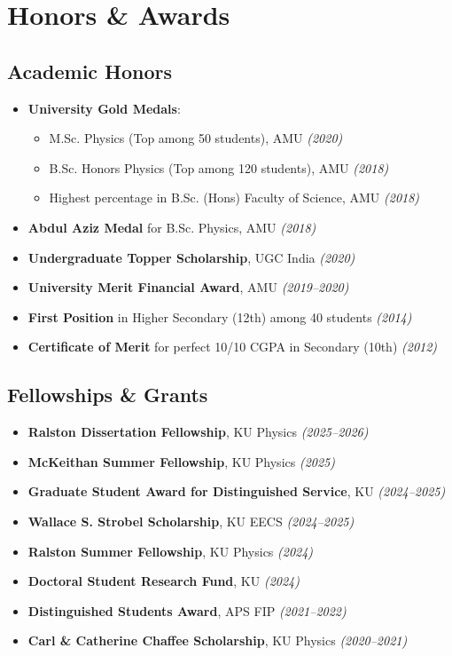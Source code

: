 \documentclass[10pt]{report}
\begin{document}
\section*{Honors \& Awards}
\subsection*{Academic Honors}
\begin{itemize}
    \item \textbf{University Gold Medals}:
    \begin{itemize}[label={\color{black}$\checkmark$}]
        \item M.Sc. Physics (Top among 50 students), AMU \textit{(2020)}
        \item B.Sc. Honors Physics (Top among 120 students), AMU \textit{(2018)}
        \item Highest percentage in B.Sc. (Hons) Faculty of Science, AMU \textit{(2018)}
    \end{itemize}
    \item \textbf{Abdul Aziz Medal} for B.Sc. Physics, AMU \textit{(2018)}
    \item \textbf{Undergraduate Topper Scholarship}, UGC India \textit{(2020)}
    \item \textbf{University Merit Financial Award}, AMU \textit{(2019--2020)}
    \item \textbf{First Position} in Higher Secondary (12th) among 40 students \textit{(2014)}
    \item \textbf{Certificate of Merit} for perfect 10/10 CGPA in Secondary (10th) \textit{(2012)}
\end{itemize}

\subsection*{Fellowships \& Grants}
\begin{itemize}
    \item \textbf{Ralston Dissertation Fellowship}, KU Physics \textit{(2025--2026)}
    \item \textbf{McKeithan Summer Fellowship}, KU Physics \textit{(2025)}
    \item \textbf{Graduate Student Award for Distinguished Service}, KU \textit{(2024--2025)}
    \item \textbf{Wallace S. Strobel Scholarship}, KU EECS \textit{(2024--2025)}
    \item \textbf{Ralston Summer Fellowship}, KU Physics \textit{(2024)}
    \item \textbf{Doctoral Student Research Fund}, KU \textit{(2024)}
    \item {\bf Distinguished Students Award}, APS FIP \textit{(2021--2022)}
    \item \textbf{Carl \& Catherine Chaffee Scholarship}, KU Physics \textit{(2020--2021)}
\end{itemize}
\end{document}
